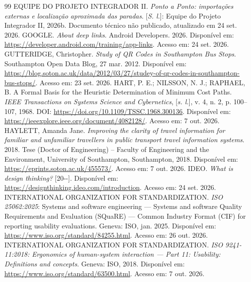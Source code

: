 \documentclass[12pt,oneside,a4paper,brazil,chapter=TITLE]{abntex2}
\begin{document}
\begin{thebibliography}{99}
 EQUIPE DO PROJETO INTEGRADOR II. \textit{Ponto a Ponto: importações externas e localização aproximada das paradas}. [\textit{S. l.}]: Equipe do Projeto Integrador II, 2026b. Documento técnico não publicado, atualizado em 24 set. 2026.
 GOOGLE. \textit{About deep links}. Android Developers. 2026. Disponível em: \url{https://developer.android.com/training/app-links}. Acesso em: 24 set. 2026.
 GUTTERIDGE, Christopher. \textit{Study of QR Codes in Southampton Bus Stops}. Southampton Open Data Blog, 27 mar. 2012. Disponível em: \url{https://blog.soton.ac.uk/data/2012/03/27/studey-of-qr-codes-in-southampton-bus-stops/}. Acesso em: 23 set. 2026.
 HART, P. E.; NILSSON, N. J.; RAPHAEL, B. A Formal Basis for the Heuristic Determination of Minimum Cost Paths. \textit{IEEE Transactions on Systems Science and Cybernetics}, [\textit{s. l.}], v. 4, n. 2, p. 100--107, 1968. DOI: \url{https://doi.org/10.1109/TSSC.1968.300136}. Disponível em: \url{https://ieeexplore.ieee.org/document/4082128/}. Acesso em: 7 out. 2026.
 HAYLETT, Amanda Jane. \textit{Improving the clarity of travel information for familiar and unfamiliar travellers in public transport travel information systems}. 2018. Tese (Doctor of Engineering) -- Faculty of Engineering and the Environment, University of Southampton, Southampton, 2018. Disponível em: \url{https://eprints.soton.ac.uk/455573/}. Acesso em: 7 out. 2026.
 IDEO. \textit{What is design thinking?} [20\mbox{-}\mbox{-}]. Disponível em: \url{https://designthinking.ideo.com/introduction}. Acesso em: 24 set. 2026.
 INTERNATIONAL ORGANIZATION FOR STANDARDIZATION. \textit{ISO 25062:2025}: Systems and software engineering --- Systems and software Quality Requirements and Evaluation (SQuaRE) --- Common Industry Format (CIF) for reporting usability evaluations. Geneva: ISO, jan. 2025. Disponível em: \url{https://www.iso.org/standard/84255.html}. Acesso em: 26 out. 2026.
 INTERNATIONAL ORGANIZATION FOR STANDARDIZATION. \textit{ISO 9241-11:2018: Ergonomics of human-system interaction --- Part 11: Usability: Definitions and concepts}. Geneva: ISO, 2018. Disponível em: \url{https://www.iso.org/standard/63500.html}. Acesso em: 7 out. 2026.

\end{thebibliography}
\end{document}
